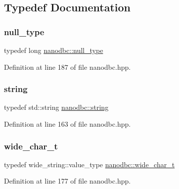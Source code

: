 \subsection{Typedef Documentation}
\mbox{\label{namespacenanodbc_ad636e9d08ea26f54100aa013031f8344}} 
\subsubsection{\texorpdfstring{null\_type}{null\_type}}
{\footnotesize\ttfamily typedef long \mbox{\hyperlink{namespacenanodbc_ad636e9d08ea26f54100aa013031f8344}{nanodbc\+::null\+\_\+type}}}



Definition at line 187 of file nanodbc.\+hpp.

\mbox{\label{namespacenanodbc_abfc0ece56278e590911ec8352774c212}} 
\subsubsection{\texorpdfstring{string}{string}}
{\footnotesize\ttfamily typedef std\+::string \mbox{\hyperlink{namespacenanodbc_abfc0ece56278e590911ec8352774c212}{nanodbc\+::string}}}



Definition at line 163 of file nanodbc.\+hpp.

\mbox{\label{namespacenanodbc_ad2d466f268b27c7f76a801379dbeb101}} 
\subsubsection{\texorpdfstring{wide\_char\_t}{wide\_char\_t}}
{\footnotesize\ttfamily typedef wide\+\_\+string\+::value\+\_\+type \mbox{\hyperlink{namespacenanodbc_ad2d466f268b27c7f76a801379dbeb101}{nanodbc\+::wide\+\_\+char\+\_\+t}}}



Definition at line 177 of file nanodbc.\+hpp.

\mbox{\label{namespacenanodbc_aeddf33f0df2bb9ba05323112e3aed316}} 
